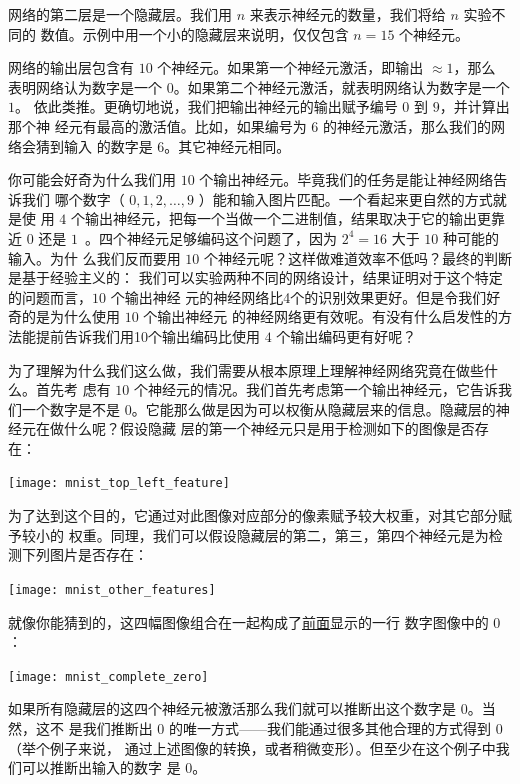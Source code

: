 网络的第二层是一个隐藏层。我们用 $n$ 来表示神经元的数量，我们将给 $n$ 实验不同的
数值。示例中用一个小的隐藏层来说明，仅仅包含 $n=15$ 个神经元。

网络的输出层包含有 $10$ 个神经元。如果第一个神经元激活，即输出 $\approx 1$，那么
表明网络认为数字是一个 $0$。如果第二个神经元激活，就表明网络认为数字是一个 $1$。
依此类推。更确切地说，我们把输出神经元的输出赋予编号 $0$ 到 $9$，并计算出那个神
经元有最高的激活值。比如，如果编号为 $6$ 的神经元激活，那么我们的网络会猜到输入
的数字是 $6$。其它神经元相同。

你可能会好奇为什么我们用 $10$ 个输出神经元。毕竟我们的任务是能让神经网络告诉我们
哪个数字（ $0, 1, 2, \ldots, 9$ ）能和输入图片匹配。一个看起来更自然的方式就是使
用 $4$ 个输出神经元，把每一个当做一个二进制值，结果取决于它的输出更靠近 $0$ 还是
$1$~。四个神经元足够编码这个问题了，因为 $2^4 = 16$ 大于 $10$ 种可能的输入。为什
么我们反而要用 $10$ 个神经元呢？这样做难道效率不低吗？最终的判断是基于经验主义的：
我们可以实验两种不同的网络设计，结果证明对于这个特定的问题而言，$10$ 个输出神经
元的神经网络比4个的识别效果更好。但是令我们好奇的是为什么使用 $10$ 个输出神经元
的神经网络更有效呢。有没有什么启发性的方法能提前告诉我们用10个输出编码比使用 $4$
个输出编码更有好呢？

为了理解为什么我们这么做，我们需要从根本原理上理解神经网络究竟在做些什么。首先考
虑有 $10$ 个神经元的情况。我们首先考虑第一个输出神经元，它告诉我们一个数字是不是
0。它能那么做是因为可以权衡从隐藏层来的信息。隐藏层的神经元在做什么呢？假设隐藏
层的第一个神经元只是用于检测如下的图像是否存在：
\begin{center}
  \texttt{[image: mnist\_top\_left\_feature]}
\end{center}

为了达到这个目的，它通过对此图像对应部分的像素赋予较大权重，对其它部分赋予较小的
权重。同理，我们可以假设隐藏层的第二，第三，第四个神经元是为检测下列图片是否存在：
\begin{center}
  \texttt{[image: mnist\_other\_features]}
\end{center}

就像你能猜到的，这四幅图像组合在一起构成了\hyperref[fig:digits]{前面}显示的一行
数字图像中的 $0$：
\begin{center}
  \texttt{[image: mnist\_complete\_zero]}
\end{center}

如果所有隐藏层的这四个神经元被激活那么我们就可以推断出这个数字是 $0$。当然，这不
是我们推断出 $0$ 的唯一方式——我们能通过很多其他合理的方式得到 $0$ （举个例子来说，
  通过上述图像的转换，或者稍微变形）。但至少在这个例子中我们可以推断出输入的数字
是 $0$。

